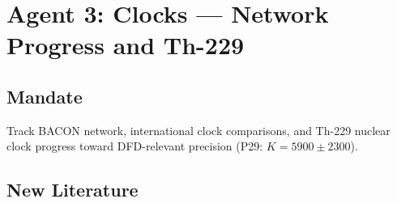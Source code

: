 \documentclass[11pt,a4paper]{article}
\begin{document}
\section{Agent 3: Clocks --- Network Progress and Th-229}

\subsection{Mandate}
Track BACON network, international clock comparisons, and Th-229 nuclear clock progress toward DFD-relevant precision (P29: $K = 5900 \pm 2300$).

\subsection{New Literature}
\end{document}
